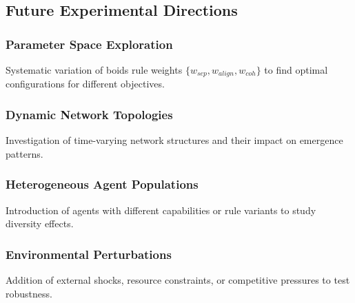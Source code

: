 \documentclass[10pt]{article}
\begin{document}
\subsection{Future Experimental Directions}

\subsubsection{Parameter Space Exploration}
Systematic variation of boids rule weights $\{w_{sep}, w_{align}, w_{coh}\}$ to find optimal configurations for different objectives.

\subsubsection{Dynamic Network Topologies}
Investigation of time-varying network structures and their impact on emergence patterns.

\subsubsection{Heterogeneous Agent Populations}
Introduction of agents with different capabilities or rule variants to study diversity effects.

\subsubsection{Environmental Perturbations}
Addition of external shocks, resource constraints, or competitive pressures to test robustness.
\end{document}

